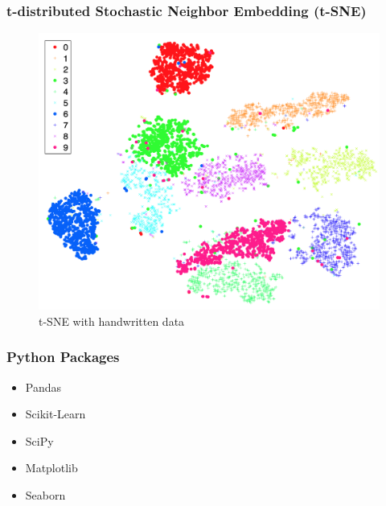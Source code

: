 \documentclass{beamer}
\begin{document}
    \begin{frame}
        \frametitle{t-distributed Stochastic Neighbor Embedding (t-SNE)}

        \begin{figure}[h!]
            \includegraphics[width=0.6 \linewidth]{figures/tsne.png}
            \caption{t-SNE with handwritten data \protect \cite{tsne1}}
        \end{figure}
    \end{frame}

    \begin{frame}
        \frametitle{Python Packages}

        \begin{itemize}
            \item Pandas \cite{pandas1}
            \item Scikit-Learn \cite{sklearn1}
            \item SciPy \cite{scipy1}
            \item Matplotlib \cite{matplotlib1}
            \item Seaborn \cite{seaborn1}
        \end{itemize}
    \end{frame}
\end{document}
